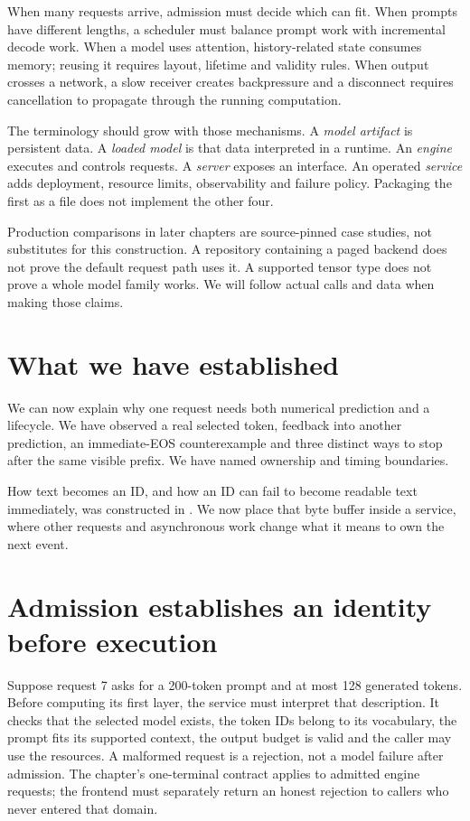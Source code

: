 When many requests arrive, admission must decide which can fit. When prompts
have different lengths, a scheduler must balance prompt work with incremental
decode work. When a model uses attention, history-related state consumes
memory; reusing it requires layout, lifetime and validity rules. When output
crosses a network, a slow receiver creates backpressure and a disconnect
requires cancellation to propagate through the running computation.

The terminology should grow with those mechanisms. A \emph{model artifact}
is persistent data. A \emph{loaded model} is that data interpreted in a runtime.
An \emph{engine} executes and controls requests. A \emph{server} exposes an
interface. An operated \emph{service} adds deployment, resource limits,
observability and failure policy. Packaging the first as a file does not
implement the other four.

Production comparisons in later chapters are source-pinned case studies,
not substitutes for this construction. A repository containing a paged backend
does not prove the default request path uses it. A supported tensor type does
not prove a whole model family works. We will follow actual calls and data
when making those claims.

\section{What we have established}
We can now explain why one request needs both numerical prediction and a
lifecycle. We have observed a real selected token, feedback into another
prediction, an immediate-EOS counterexample and three distinct ways to stop
after the same visible prefix. We have named ownership and timing boundaries.

How text becomes an ID, and how an ID can fail to become readable text
immediately, was constructed in . We now place that byte
buffer inside a service, where other requests and asynchronous work change
what it means to own the next event.

\section{Admission establishes an identity before execution}
Suppose request 7 asks for a 200-token prompt and at most 128 generated
tokens. Before computing its first layer, the service must interpret that
description. It checks that the selected model exists, the token IDs belong
to its vocabulary, the prompt fits its supported context, the output budget
is valid and the caller may use the resources. A malformed request is a
rejection, not a model failure after admission. The chapter's one-terminal
contract applies to admitted engine requests; the frontend must separately
return an honest rejection to callers who never entered that domain.

